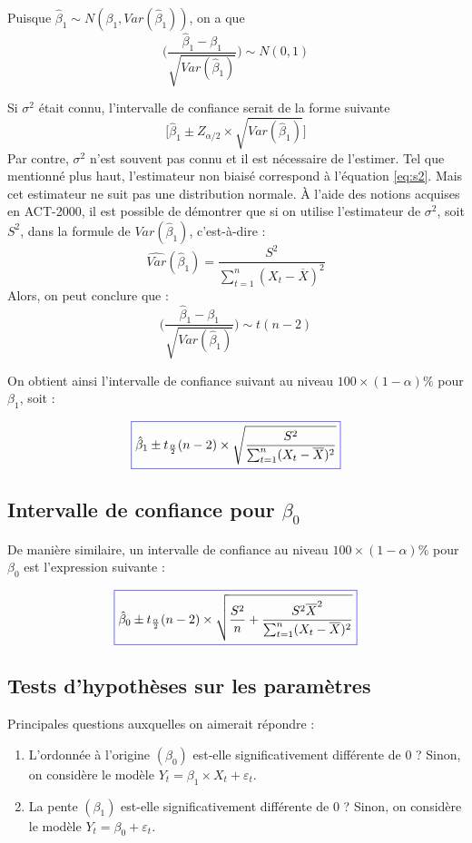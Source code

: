 \documentclass[11pt,french]{report}
\begin{document}
\bigskip
Puisque $ \hat{\beta}_1 \sim N(\beta_1, Var(\hat{\beta}_1))$, on a que 
$$
\Bigg(\frac{\hat{\beta}_1 - \beta_1}{\sqrt{Var(\hat{\beta}_1)}}\Bigg) \sim N(0,1)
$$

Si $\sigma^2$ était connu, l'intervalle de confiance serait de la forme suivante 
$$
\bigg[\hat{\beta}_1\pm Z_{\alpha/2} \times \sqrt{Var(\hat{\beta}_1)}\bigg]
$$
Par contre, $\sigma^2$ n'est  souvent pas connu et il est nécessaire de l'estimer. Tel que mentionné plus haut, l'estimateur non biaisé correspond à l'équation \ref{eq:s2}. Mais cet estimateur ne suit pas une distribution normale. À l'aide des notions acquises en ACT-2000, il est possible de démontrer que si on utilise l'estimateur de $\sigma^2$, soit $S^2$, dans la formule de $Var(\hat{\beta}_1)$, c'est-à-dire :
$$
\widehat{Var}(\hat{\beta}_1) = \frac{S^2}{\sum_{t=1}^n (X_t - \overline{X})^2}
$$
Alors, on peut conclure que :
$$
\Bigg(\frac{\hat{\beta}_1 - \beta_1}{\sqrt{Var(\hat{\beta}_1)}}\Bigg) \sim t(n-2)
$$

On obtient ainsi l'intervalle de confiance suivant au niveau $100 \times (1 - \alpha)\%$ pour $\beta_1$, soit :

\begin{equation}
\label{eq:intconfb1}
\color{blue}
\boxed{\color{black}
\hat{\beta}_1 \pm t_{\frac{\alpha}{2}}(n-2) \times \sqrt{\frac{S^2}{\sum_{t=1}^n (X_t - \overline{X})^2}}}
\end{equation}

\subsection{Intervalle de confiance pour $\beta_0$}
De manière similaire, un intervalle de confiance au niveau $100 \times (1 - \alpha)\%$ pour $\beta_0$ est l'expression suivante :

\begin{equation}
\label{eq:intconfb0}
\color{blue}
\boxed{\color{black}
\hat{\beta}_0 \pm t_{\frac{\alpha}{2}}(n-2) \times \sqrt{\frac{S^2}{n} + \frac{S^2\overline{X}^2}{\sum_{t=1}^n (X_t - \overline{X})^2}}}
\end{equation}

\subsection{Tests d'hypothèses sur les paramètres}
Principales questions auxquelles on aimerait répondre :
\begin{enumerate}
\item \label{hyp1} L'ordonnée à l'origine $(\beta_0)$ est-elle significativement différente de 0 ? \newline
Sinon, on considère le modèle $Y_t = \beta_1\times X_t + \varepsilon_t$.
\item  \label{hyp2} La pente $(\beta_1)$ est-elle significativement différente de 0 ? \newline
Sinon, on considère le modèle $Y_t = \beta_0 + \varepsilon_t$.
\end{enumerate}
\end{document}
